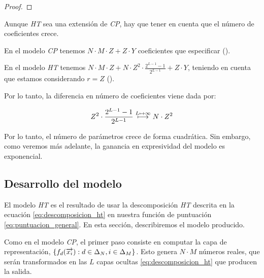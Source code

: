 \begin{proof}


\end{proof}

\begin{observacion}

    Aunque \textit{HT} sea una extensión de \textit{CP}, hay que tener en cuenta que el número de coeficientes crece.

    En el modelo \textit{CP} tenemos $N \cdot M \cdot Z + Z \cdot Y$ coeficientes que especificar ().

    En el modelo \textit{HT} tenemos $N \cdot M \cdot Z + N \cdot Z^2 \cdot \frac{2^{L-1} - 1}{2^{L-1}} + Z \cdot Y$, teniendo en cuenta que estamos considerando $r = Z$ ().

    Por lo tanto, la diferencia en número de coeficientes viene dada por:

    \begin{equation}
        Z^2 \cdot \frac{2^{L-1} - 1}{2^{L-1}} \stackrel{L \mapsto \infty}{\longmapsto} N \cdot Z^2
    \end{equation}

    Por lo tanto, el número de parámetros crece de forma cuadrática. Sin embargo, como veremos más adelante, la ganancia en expresividad del modelo es exponencial.

\end{observacion}

\subsection{Desarrollo del modelo}

El modelo \textit{HT} es el resultado de usar la descomposición \textit{HT} descrita en la ecuación \eqref{eq:descomposicion_ht} en nuestra función de puntuación \eqref{eq:puntuacion_general}. En esta sección, describiremos el modelo producido.

Como en el modelo \textit{CP}, el primer paso consiste en computar la capa de representación, $\{f_d(\overrightarrow{x_i}): d \in \Delta_{N}, i \in \Delta_{M}\}$. Esto genera $N \cdot M$ números reales, que serán transformados en las $L$ capas ocultas \eqref{eq:descomposicion_ht} que producen la salida.

